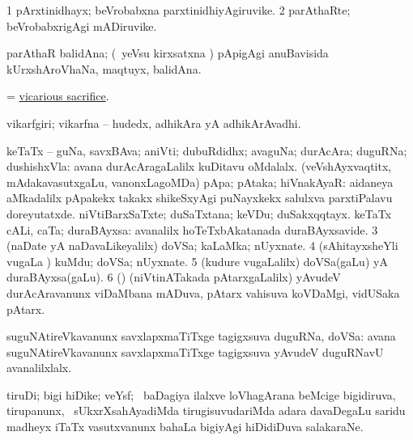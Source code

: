 \bentry
{} 
\gl{\nA}
\expl{}
\bmng
\bnum
\num{1} pArxtinidhayx; beVrobabxna parxtinidhiyAgiruvike. 
\num{2} parAthaRte; beVrobabxrigAgi mADiruvike. 
\enum
\emng
\eentry

\bentry
{}
\gl{\nA}
\expl{}
\bmng
 parAthaR balidAna; (\kanmu\ yeVsu kirxsatxna \vi) pApigAgi anuBavisida kUrxshAroVhaNa, maqtuyx, balidAna. 
\emng
\eentry

\bentry
{}
\gl{\nA}
\expl{}
\bmng
 = \hyperlink{vicarious sacrifice}{vicarious sacrifice}. 
\emng
\eentry

\bentry
{} 
\gl{\nA}
\expl{}
\bmng
 vikarfgiri; vikarfna -- hudedx, adhikAra yA adhikArAvadhi. 
\emng
\eentry

\bentry
{} 
\gl{\nA}
\expl{}
\bmng
\bnum
{} 
\banum
{} keTaTx -- guNa, savxBAva; aniVti; dubuRdidhx; avaguNa; durAcAra; duguRNa; dushishxVla:  avana durAcAragaLalilx kuDitavu oMdalalx. 
 (veVshAyxvaqtitx, mAdakavasutxgaLu, \mo vanonxLagoMDa) pApa; pAtaka; hiVnakAyaR:  aidaneya aMkadalilx pApakekx takakx shikeSxyAgi puNayxkekx salulxva parxtiPalavu doreyutatxde. 
\eanum
\numie
{} 
\banum
{} niVtiBarxSaTxte; duSaTxtana; keVDu; duSakxqqtayx. 
 keTaTx cALi, caTa; duraBAyxsa:  avanalilx hoTeTxbAkatanada duraBAyxsavide. 
\eanum
\numie
\num{3} (naDate yA naDavaLikeyalilx) doVSa; kaLaMka; nUyxnate. 
\num{4} (sAhitayxsheYli \mo vugaLa \vi) kuMdu; doVSa; nUyxnate. 
\num{5} (kudure \mo vugaLalilx) doVSa(gaLu) yA duraBAyxsa(gaLu). 
\num{6} (\ca) (niVtinATakada pAtarxgaLalilx) yAvudeV durAcAravanunx viDaMbana mADuva, pAtarx vahisuva koVDaMgi, vidUSaka pAtarx. 
\enum
\emng

\noindent 
\gl{\pagu}
\expl{}
\bmng
  suguNAtireVkavanunx savxlapxmaTiTxge tagigxsuva duguRNa, doVSa:  avana suguNAtireVkavanunx savxlapxmaTiTxge tagigxsuva yAvudeV duguRNavU avanalilxlalx. 
\emng
\eentry

\bentry 
{} 
\gl{\nA}
\expl{}
\bmng
 tiruDi; bigi hiDike; veYsf; \kanmu\ baDagiya ilalxve loVhagArana beMcige bigidiruva, tirupanunx, \kanmu\ sUkxrXsahAyadiMda tirugisuvudariMda adara davaDegaLu saridu madheyx iTaTx vasutxvanunx bahaLa bigiyAgi hiDidiDuva salakaraNe. 
\emng
\eentry

